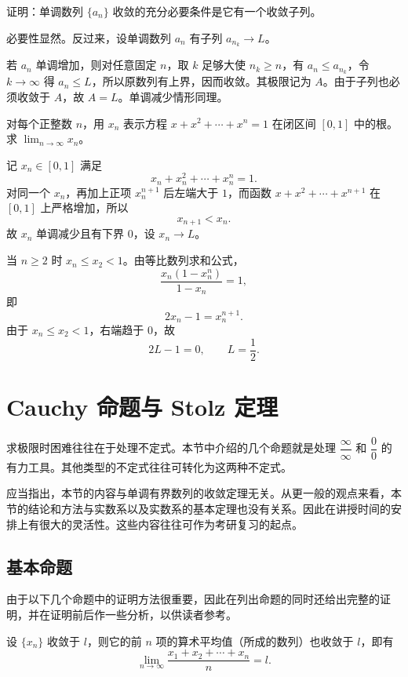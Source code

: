 \begin{xexercise}[11]
证明：单调数列 $\{a_n\}$ 收敛的充分必要条件是它有一个收敛子列。
\end{xexercise}
\begin{xsolution}
必要性显然。反过来，设单调数列 $a_n$ 有子列 $a_{n_k}\to L$。

若 $a_n$ 单调增加，则对任意固定 $n$，取 $k$ 足够大使 $n_k\ge n$，有 $a_n\le a_{n_k}$，令 $k\to\infty$ 得 $a_n\le L$，所以原数列有上界，因而收敛。其极限记为 $A$。由于子列也必须收敛于 $A$，故 $A=L$。单调减少情形同理。
\end{xsolution}


\begin{xexercise}[12]
对每个正整数 $n$，用 $x_n$ 表示方程 $x+x^2+\cdots+x^n=1$ 在闭区间 $[0,1]$ 中的根。求 $\displaystyle\lim_{n\to\infty}x_n$。
\end{xexercise}
\begin{xsolution}
记 $x_n\in[0,1]$ 满足
\[
  x_n+x_n^2+\cdots+x_n^n=1.
\]
对同一个 $x_n$，再加上正项 $x_n^{n+1}$ 后左端大于 $1$，而函数 $x+x^2+\cdots+x^{n+1}$ 在 $[0,1]$ 上严格增加，所以
\[
  x_{n+1}<x_n.
\]
故 $x_n$ 单调减少且有下界 $0$，设 $x_n\to L$。

当 $n\ge2$ 时 $x_n\le x_2<1$。由等比数列求和公式，
\[
  \frac{x_n(1-x_n^n)}{1-x_n}=1,
\]
即
\[
  2x_n-1=x_n^{n+1}.
\]
由于 $x_n\le x_2<1$，右端趋于 $0$，故
\[
  2L-1=0,
  \qquad
  \boxed{L=\frac12}.
\]
\end{xsolution}


\section{Cauchy 命题与 Stolz 定理}

求极限时困难往往在于处理不定式。本节中介绍的几个命题就是处理 $\dfrac\infty\infty$ 和 $\dfrac00$ 的有力工具。其他类型的不定式往往可转化为这两种不定式。

应当指出，本节的内容与单调有界数列的收敛定理无关。从更一般的观点来看，本节的结论和方法与实数系以及实数系的基本定理也没有关系。因此在讲授时间的安排上有很大的灵活性。这些内容往往可作为考研复习的起点。

\subsection{基本命题}

由于以下几个命题中的证明方法很重要，因此在列出命题的同时还给出完整的证明，并在证明前后作一些分析，以供读者参考。

\begin{xproposition}[2.4.1（Cauchy 命题）]
设 $\{x_n\}$ 收敛于 $l$，则它的前 $n$ 项的算术平均值（所成的数列）也收敛于 $l$，即有
\[
  \lim_{n\to\infty}\frac{x_1+x_2+\cdots+x_n}{n}=l.
\]
\end{xproposition}

